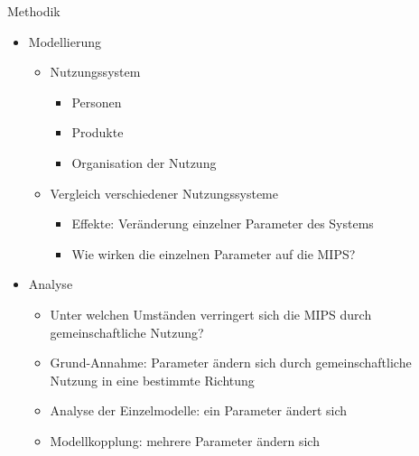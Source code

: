 \documentclass[beamer, xcolor=table]{beamer}
\begin{document}
	\begin{frame}{Methodik}
		\begin{center}
            \begin{itemize}
                \item<1-> Modellierung
                    \begin{itemize}
                        \item Nutzungssystem
                            \begin{itemize}
                                \item Personen 
                                \item Produkte
                                \item Organisation der Nutzung
                            \end{itemize}
                        \item Vergleich verschiedener Nutzungssysteme
                            \begin{itemize}
                                \item Effekte: Veränderung einzelner Parameter
                                    des Systems 
                                \item Wie wirken die einzelnen Parameter auf die
                                    MIPS?
                            \end{itemize}
                    \end{itemize}

                \item<2> Analyse
                    \begin{itemize}
                        \item Unter welchen Umständen verringert sich die MIPS
                            durch gemeinschaftliche Nutzung?
                        \item Grund-Annahme: Parameter ändern sich durch
                            gemeinschaftliche Nutzung in eine bestimmte Richtung
                        \item Analyse der Einzelmodelle: ein Parameter ändert
                        sich 
                    \item Modellkopplung: mehrere Parameter ändern sich	
                    \end{itemize}
            \end{itemize}
		\end{center}
	\end{frame}
\end{document}
